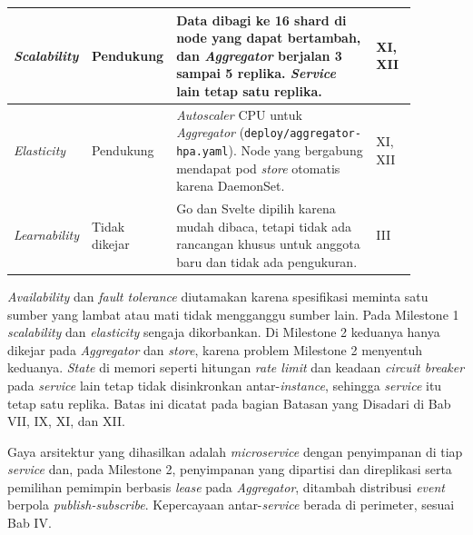 \begin{longtable}[]{|>{\raggedright\arraybackslash}p{0.16\linewidth}|>{\raggedright\arraybackslash}p{0.12\linewidth}|>{\raggedright\arraybackslash}p{0.5\linewidth}|>{\raggedright\arraybackslash}p{0.1\linewidth}|}
\hline
\textit{Scalability} & Pendukung & Data dibagi ke 16 shard di node yang dapat bertambah, dan \textit{Aggregator} berjalan 3 sampai 5 replika. \textit{Service} lain tetap satu replika. & XI, XII \\
\hline
\textit{Elasticity} & Pendukung & \textit{Autoscaler} CPU untuk \textit{Aggregator} (\texttt{deploy/aggregator-hpa.yaml}). Node yang bergabung mendapat pod \textit{store} otomatis karena DaemonSet. & XI, XII \\
\hline
\textit{Learnability} & Tidak dikejar & Go dan Svelte dipilih karena mudah dibaca, tetapi tidak ada rancangan khusus untuk anggota baru dan tidak ada pengukuran. & III \\
\hline
\end{longtable}

\textit{Availability} dan \textit{fault tolerance} diutamakan karena spesifikasi meminta satu sumber yang lambat atau mati tidak mengganggu sumber lain. Pada Milestone 1 \textit{scalability} dan \textit{elasticity} sengaja dikorbankan. Di Milestone 2 keduanya hanya dikejar pada \textit{Aggregator} dan \textit{store}, karena problem Milestone 2 menyentuh keduanya. \textit{State} di memori seperti hitungan \textit{rate limit} dan keadaan \textit{circuit breaker} pada \textit{service} lain tetap tidak disinkronkan antar-\textit{instance}, sehingga \textit{service} itu tetap satu replika. Batas ini dicatat pada bagian Batasan yang Disadari di Bab VII, IX, XI, dan XII.

Gaya arsitektur yang dihasilkan adalah \textit{microservice} dengan penyimpanan di tiap \textit{service} dan, pada Milestone 2, penyimpanan yang dipartisi dan direplikasi serta pemilihan pemimpin berbasis \textit{lease} pada \textit{Aggregator}, ditambah distribusi \textit{event} berpola \textit{publish-subscribe}. Kepercayaan antar-\textit{service} berada di perimeter, sesuai Bab IV.

